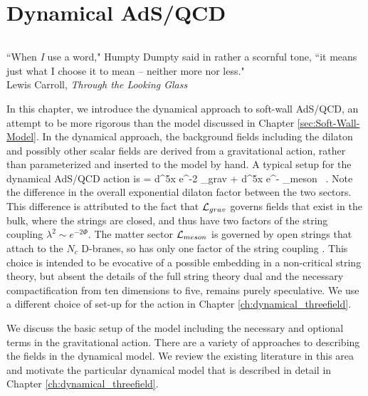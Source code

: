 \chapter{Dynamical AdS/QCD}
\label{ch:dynamical}

\begin{minipage}[r]{0.333\textwidth}
 $ \left. \right.$
\end{minipage}
\begin{minipage}[c]{0.667\textwidth}
\begin{flushright}
``When \emph{I} use a word," Humpty Dumpty said in rather a scornful tone,
 ``it means just what I choose it to mean -- neither more nor less." \\
Lewis Carroll, \emph{Through the Looking Glass}
\end{flushright}
\end{minipage}
\vspace*{\baselineskip}

In this chapter, we introduce the dynamical approach to soft-wall AdS/QCD, an attempt to be more rigorous than the model discussed in Chapter \ref{sec:Soft-Wall-Model}.
In the dynamical approach, the background fields including the dilaton and possibly other scalar fields are derived from a gravitational action, rather than parameterized and inserted to the model by hand.
A typical setup for the dynamical AdS/QCD action is 
\be
{} = \int d^5x \root e^{-2\Phi} _{grav} + \int d^5x \root e^{-\Phi} _{meson} \, .
\ee 
Note the difference in the overall exponential dilaton factor between the two sectors.
This difference is attributed to the fact that $\mathcal L_{grav}$ governs fields that exist in the bulk, where the strings are closed, and thus have two factors of the string coupling $\lambda^2 \sim e^{-2\Phi}$. 
The matter sector $\mathcal L_{meson}$ is governed by open strings that attach to the $N_c$ D-branes, so has only one factor of the string coupling \cite{stringnutshell}. 
This choice is intended to be evocative of a possible embedding in a non-critical string theory, but absent the details of the full string theory dual and the necessary compactification from ten dimensions to five, remains purely speculative.
We use a different choice of set-up for the action in Chapter \ref{ch:dynamical_threefield}.

We discuss the basic setup of the model including the necessary and optional terms in the gravitational action.
There are a variety of approaches to describing the fields in the dynamical model.
We review the existing literature in this area and motivate the particular dynamical model that is described in detail in Chapter \ref{ch:dynamical_threefield}.

